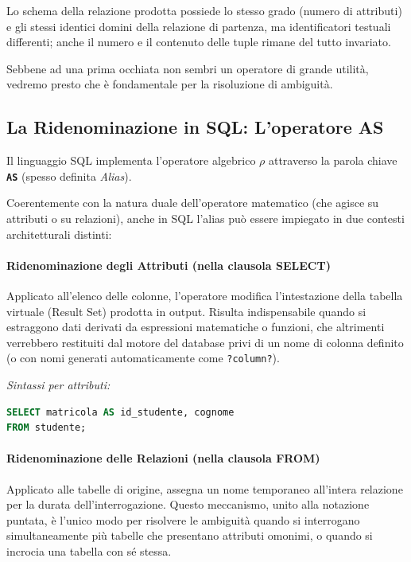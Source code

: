 \medskip

Lo schema della relazione prodotta possiede lo stesso grado (numero di attributi) e gli stessi identici domini della relazione di partenza, ma identificatori testuali differenti; anche il numero e il contenuto delle tuple rimane del tutto invariato. 

Sebbene ad una prima occhiata non sembri un operatore di grande utilità, vedremo presto che è fondamentale per la risoluzione di ambiguità. 

\subsection{La Ridenominazione in SQL: L'operatore AS}

Il linguaggio SQL implementa l'operatore algebrico $\rho$ attraverso la parola chiave \textbf{\texttt{AS}} (spesso definita \textit{Alias}). 

Coerentemente con la natura duale dell'operatore matematico (che agisce su attributi o su relazioni), anche in SQL l'alias può essere impiegato in due contesti architetturali distinti:

\paragraph{Ridenominazione degli Attributi (nella clausola SELECT)}
Applicato all'elenco delle colonne, l'operatore modifica l'intestazione della tabella virtuale (Result Set) prodotta in output. Risulta indispensabile quando si estraggono dati derivati da espressioni matematiche o funzioni, che altrimenti verrebbero restituiti dal motore del database privi di un nome di colonna definito (o con nomi generati automaticamente come \texttt{?column?}).

\textit{Sintassi per attributi:}
\begin{lstlisting}[language=SQL, basicstyle=\ttfamily\small, keywordstyle=\color{blue}\bfseries]
SELECT matricola AS id_studente, cognome 
FROM studente;
\end{lstlisting}

\paragraph{Ridenominazione delle Relazioni (nella clausola FROM)}
Applicato alle tabelle di origine, assegna un nome temporaneo all'intera relazione per la durata dell'interrogazione. Questo meccanismo, unito alla notazione puntata, è l'unico modo per risolvere le ambiguità quando si interrogano simultaneamente più tabelle che presentano attributi omonimi, o quando si incrocia una tabella con sé stessa.

